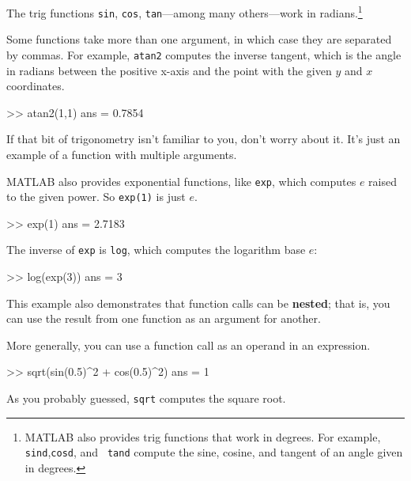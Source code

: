 \documentclass[
]{book}
\numberwithin{Answer}{chapter}
\numberwithin{Exercise}{chapter}
\begin{document}

The trig functions {\tt sin}, {\tt cos}, {\tt tan}---among many
others---work in radians.\footnote{MATLAB also provides trig functions
that work in degrees. For example, {\tt sind},{\tt cosd}, and {\tt
tand} compute the sine, cosine, and tangent of an angle given in
degrees.}

Some functions take more than one argument, in which case they are
separated by commas.  For example, {\tt atan2} computes the inverse
tangent, which is the angle in radians between the positive x-axis and
the point with the given $y$ and $x$ coordinates.

\begin{code}
>> atan2(1,1)
ans = 0.7854
\end{code}

If that bit of trigonometry isn't familiar to you, don't worry about
it.  It's just an example of a function with multiple arguments.


MATLAB also provides exponential functions, like {\tt exp}, which computes $e$ raised to the given power.  So {\tt exp(1)} is just $e$.

\begin{code}
>> exp(1)
ans = 2.7183
\end{code}


The inverse of {\tt exp} is {\tt log}, which computes the logarithm base $e$:

\begin{code}
>> log(exp(3))
ans = 3
\end{code}

This example also demonstrates that function calls can be {\bf nested};
that is, you can use the result from one function as an argument for
another.


More generally, you can use a function call as an operand in an expression.

\begin{code}
>> sqrt(sin(0.5)^2 + cos(0.5)^2)
ans = 1
\end{code}

As you probably guessed, {\tt sqrt} computes the square root.

\end{document}
